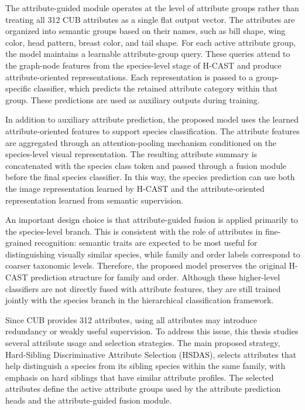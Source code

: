 The attribute-guided module operates at the level of attribute groups rather than treating all 312 CUB attributes as a single flat output vector. The attributes are organized into semantic groups based on their names, such as bill shape, wing color, head pattern, breast color, and tail shape. For each active attribute group, the model maintains a learnable attribute-group query. These queries attend to the graph-node features from the species-level stage of H-CAST and produce attribute-oriented representations. Each representation is passed to a group-specific classifier, which predicts the retained attribute category within that group. These predictions are used as auxiliary outputs during training.

In addition to auxiliary attribute prediction, the proposed model uses the learned attribute-oriented features to support species classification. The attribute features are aggregated through an attention-pooling mechanism conditioned on the species-level visual representation. The resulting attribute summary is concatenated with the species class token and passed through a fusion module before the final species classifier. In this way, the species prediction can use both the image representation learned by H-CAST and the attribute-oriented representation learned from semantic supervision.

An important design choice is that attribute-guided fusion is applied primarily to the species-level branch. This is consistent with the role of attributes in fine-grained recognition: semantic traits are expected to be most useful for distinguishing visually similar species, while family and order labels correspond to coarser taxonomic levels. Therefore, the proposed model preserves the original H-CAST prediction structure for family and order. Although these higher-level classifiers are not directly fused with attribute features, they are still trained jointly with the species branch in the hierarchical classification framework.

Since CUB provides 312 attributes, using all attributes may introduce redundancy or weakly useful supervision. To address this issue, this thesis studies several attribute usage and selection strategies. The main proposed strategy, Hard-Sibling Discriminative Attribute Selection (HSDAS), selects attributes that help distinguish a species from its sibling species within the same family, with emphasis on hard siblings that have similar attribute profiles. The selected attributes define the active attribute groups used by the attribute prediction heads and the attribute-guided fusion module.

